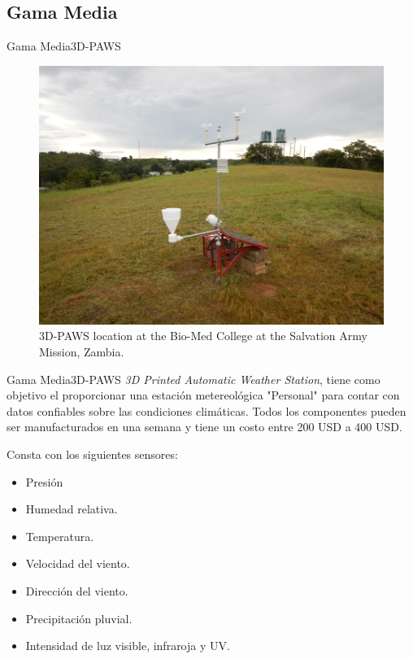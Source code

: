 \documentclass[]{beamer}
\begin{document}
\subsection{Gama Media}
\begin{frame}{Gama Media}{3D-PAWS}
  \begin{figure}
    \includegraphics[height=0.7\textheight]{Docs/3dpaws1}
    \caption{3D-PAWS location at the Bio-Med College at the Salvation Army Mission, Zambia.}
  \end{figure}
\end{frame}

\begin{frame}{Gama Media}{3D-PAWS}
\emph{3D Printed Automatic Weather Station}, tiene como objetivo el proporcionar una estación metereológica "Personal" para contar con datos confiables sobre las condiciones climáticas. Todos los componentes pueden ser manufacturados en una semana y tiene un costo entre 200 USD a 400 USD.

Consta con los siguientes sensores:
\begin{itemize}
  \item Presión
  \item Humedad relativa.
  \item Temperatura.
  \item Velocidad del viento.
  \item Dirección del viento.
  \item Precipitación pluvial.
  \item Intensidad de luz visible, infraroja y UV.
\end{itemize}

\end{frame}
\end{document}
